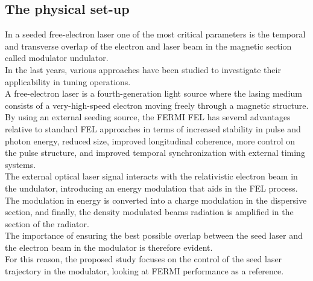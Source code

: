 \documentclass[
reprint,
amsmath,amssymb,amsfonts,clevref,
aps,
prstab,
]{revtex4-2}
\begin{document}
	\subsection{The physical set-up}
	In a seeded free-electron laser one of the most critical parameters is the temporal and transverse overlap of the electron and laser beam in the magnetic section called modulator undulator.\\
In the last years, various approaches have been studied to investigate their applicability in tuning operations. \\
	A free-electron laser is a fourth-generation light source where the lasing medium consists of a very-high-speed electron moving freely through a magnetic structure. By using an external seeding source, the FERMI FEL has several advantages relative to standard FEL approaches in terms of increased stability in pulse and photon energy, reduced size, improved longitudinal coherence, more control on the pulse structure, and improved temporal synchronization with external timing systems.\\
The external optical laser signal interacts with the relativistic electron beam in the undulator, introducing an energy modulation that aids in the FEL process. The modulation in energy is converted into a charge modulation in the dispersive section, and finally, the density modulated beams radiation is amplified in the section of the radiator.\\
	 The importance of ensuring the best possible overlap between the seed laser and the electron beam in the modulator is therefore evident.\\
	For this reason, the proposed study focuses on the control of the seed laser trajectory in the modulator, looking at FERMI performance as a reference.
\end{document}
